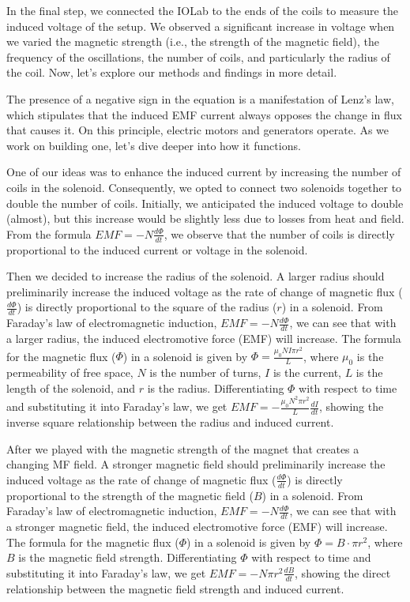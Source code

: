 \documentclass[11pt]{article}
\begin{document}
    In the final step, we connected the IOLab to the ends of the coils to measure the induced voltage of the setup. We observed a significant increase in voltage when we varied the magnetic strength (i.e., the strength of the magnetic field), the frequency of the oscillations, the number of coils, and particularly the radius of the coil. Now, let's explore our methods and findings in more detail. 

    The presence of a negative sign in the equation is a manifestation of Lenz’s law, which stipulates that the induced EMF current always opposes the change in flux that causes it.
    On this principle, electric motors and generators operate.
    As we work on building one, let's dive deeper into how it functions.
    
    One of our ideas was to enhance the induced current by increasing the number of coils in the solenoid. Consequently, we opted to connect two solenoids together to double the number of coils. Initially, we anticipated the induced voltage to double (almost), but this increase would be slightly less due to losses from heat and field. From the formula \(EMF = -N\frac{d\Phi}{dt}\), we observe that the number of coils is directly proportional to the induced current or voltage in the solenoid.
    
    Then we decided to increase the radius of the solenoid. A larger radius should preliminarily increase the induced voltage as the rate of change of magnetic flux (\( \frac{d\Phi}{dt} \)) is directly proportional to the square of the radius (\( r \)) in a solenoid. From Faraday's law of electromagnetic induction, \( EMF = -N\frac{d\Phi}{dt} \), we can see that with a larger radius, the induced electromotive force (EMF) will increase. The formula for the magnetic flux (\( \Phi \)) in a solenoid is given by \( \Phi = \frac{\mu_0 N I \pi r^2}{L} \), where \( \mu_0 \) is the permeability of free space, \( N \) is the number of turns, \( I \) is the current, \( L \) is the length of the solenoid, and \( r \) is the radius. Differentiating \( \Phi \) with respect to time and substituting it into Faraday's law, we get \( EMF = -\frac{\mu_0 N^2 \pi r^2}{L} \frac{dI}{dt} \), showing the inverse square relationship between the radius and induced current.
    
    After we played with the magnetic strength of the magnet that creates a changing MF field. A stronger magnetic field should preliminarily increase the induced voltage as the rate of change of magnetic flux (\( \frac{d\Phi}{dt} \)) is directly proportional to the strength of the magnetic field (\( B \)) in a solenoid. From Faraday's law of electromagnetic induction, \( EMF = -N\frac{d\Phi}{dt} \), we can see that with a stronger magnetic field, the induced electromotive force (EMF) will increase. The formula for the magnetic flux (\( \Phi \)) in a solenoid is given by \( \Phi = B \cdot \pi r^2 \), where \( B \) is the magnetic field strength. Differentiating \( \Phi \) with respect to time and substituting it into Faraday's law, we get \( EMF = -N \pi r^2 \frac{dB}{dt} \), showing the direct relationship between the magnetic field strength and induced current.
\end{document}
